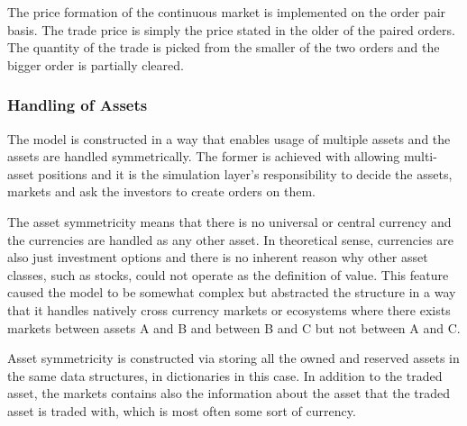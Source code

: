 The price formation of the continuous market is implemented
on the order pair basis. The trade price is simply the price
stated in the older of the paired orders. %
The quantity of the trade is picked from the smaller of the two orders
and the bigger order is partially cleared.

\subsubsection{Handling of Assets}

The model is constructed in a way that enables usage of multiple assets
and the assets are handled symmetrically. The former is achieved with
allowing multi-asset positions and it is the simulation layer's 
responsibility to decide the assets, markets and ask the investors
to create orders on them.

The asset symmetricity means that there is no universal or central currency 
and the currencies are handled as any other asset. In theoretical sense, 
currencies are also just investment options and there is no inherent reason why other 
asset classes, such as stocks, could not operate as the definition 
of value. This feature caused the model to be somewhat complex but 
abstracted the structure in a way that it handles natively cross currency
markets or ecosystems where there exists markets between assets A and 
B and between B and C but not between A and C. 

Asset symmetricity is constructed via storing all the owned and reserved
assets in the same data structures, in dictionaries in this case. In addition
to the traded asset, the markets contains also the information about the asset
that the traded asset is traded with, which is most often some sort of currency. 

